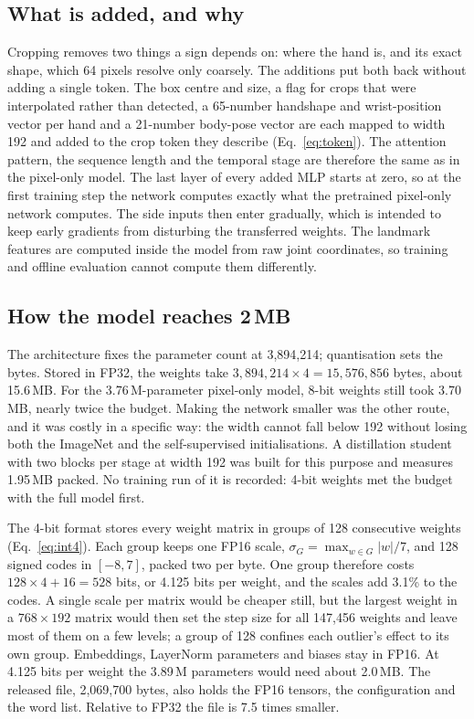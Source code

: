 \documentclass[pdflatex,sn-mathphys-num,twocolumn]{sn-jnl}
\theoremstyle{thmstyleone}%
\begin{document}
\begin{appendices}
\subsection{What is added, and why}

Cropping removes two things a sign depends on: where the hand is, and its exact shape, which 64 pixels resolve only coarsely. The additions put both back without adding a single token. The box centre and size, a flag for crops that were interpolated rather than detected, a 65-number handshape and wrist-position vector per hand and a 21-number body-pose vector are each mapped to width 192 and added to the crop token they describe (Eq.~\eqref{eq:token}). The attention pattern, the sequence length and the temporal stage are therefore the same as in the pixel-only model. The last layer of every added MLP starts at zero, so at the first training step the network computes exactly what the pretrained pixel-only network computes. The side inputs then enter gradually, which is intended to keep early gradients from disturbing the transferred weights. The landmark features are computed inside the model from raw joint coordinates, so training and offline evaluation cannot compute them differently.

\subsection{How the model reaches 2\,MB}

The architecture fixes the parameter count at 3,894,214; quantisation sets the bytes. Stored in FP32, the weights take $3{,}894{,}214\times4=15{,}576{,}856$ bytes, about 15.6\,MB. For the 3.76\,M-parameter pixel-only model, 8-bit weights still took 3.70\,MB, nearly twice the budget. Making the network smaller was the other route, and it was costly in a specific way: the width cannot fall below 192 without losing both the ImageNet and the self-supervised initialisations. A distillation student with two blocks per stage at width 192 was built for this purpose and measures 1.95\,MB packed. No training run of it is recorded: 4-bit weights met the budget with the full model first.

The 4-bit format stores every weight matrix in groups of 128 consecutive weights (Eq.~\eqref{eq:int4}). Each group keeps one FP16 scale, $\sigma_G=\max_{w\in G}|w|/7$, and 128 signed codes in $[-8,7]$, packed two per byte. One group therefore costs $128\times4+16=528$ bits, or 4.125 bits per weight, and the scales add 3.1\% to the codes. A single scale per matrix would be cheaper still, but the largest weight in a $768\times192$ matrix would then set the step size for all 147,456 weights and leave most of them on a few levels; a group of 128 confines each outlier's effect to its own group. Embeddings, LayerNorm parameters and biases stay in FP16. At 4.125 bits per weight the 3.89\,M parameters would need about 2.0\,MB. The released file, 2,069,700 bytes, also holds the FP16 tensors, the configuration and the word list. Relative to FP32 the file is 7.5 times smaller.


\end{appendices}
\end{document}
